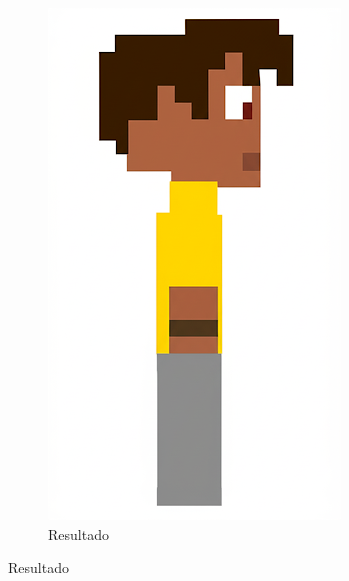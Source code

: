 \begin{figure}[htbp]
\begin{subfigure}{0.3\linewidth}
        \includegraphics[width=1\linewidth]{figs/geminiPro/chat6/tela3_res1.png}
        \caption{\small Resultado}
        \label{fig:geminiPro19a}
    \end{subfigure}
\end{figure}

